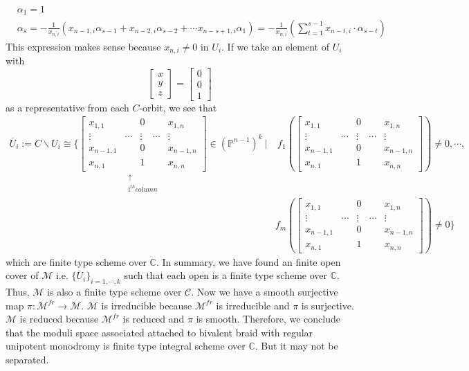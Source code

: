 \begin{example}
	\begin{align*}
		&\alpha_1=1\\
		&\alpha_s=-\frac{1}{x_{n,i}}(x_{n-1,i}\alpha_{s-1}+x_{n-2,i}\alpha_{s-2}+\cdots x_{n-s+1,i}\alpha_{1})
		=-\frac{1}{x_{n,i}}(\sum_{t=1}^{s-1} x_{n-t,i}\cdot\alpha_{s-t} )
	\end{align*}
This expression makes sense because $x_{n,i}\neq 0$ in $U_i$.
If we take an element of $U_i$ with 
\[
	\begin{bmatrix}
		x\\
		y\\
		z
	\end{bmatrix}
	=
	\begin{bmatrix}
		0\\
		0\\
		1
	\end{bmatrix}	
\]
as a representative from each $C$-orbit, we see that 
\begin{align*}
	\overline{U}_i
	:= C\backslash U_i\cong
	\{
	\underset{\substack{\uparrow \\ \text{i}^{th} column}}
	{\begin{bmatrix}
		x_{1,1}&&0 &&x_{1,n}\\
		\vdots&\cdots&\vdots&\cdots&\vdots\\
		x_{n-1,1}&&0&&x_{n-1,n}\\
		x_{n,1}&&1&&x_{n,n}
	\end{bmatrix}}
	\in (\mathbb{P}^{n-1})^k~|
	&~	
	f_1(\begin{bmatrix}
		x_{1,1}&&0 &&x_{1,n}\\
		\vdots&\cdots&\vdots&\cdots&\vdots\\
		x_{n-1,1}&&0&&x_{n-1,n}\\
		x_{n,1}&&1&&x_{n,n}
	\end{bmatrix})\neq0,
	\cdots,\\
	& 
	f_m(\begin{bmatrix}
		x_{1,1}&&0 &&x_{1,n}\\
		\vdots&\cdots&\vdots&\cdots&\vdots\\
		x_{n-1,1}&&0&&x_{n-1,n}\\
		x_{n,1}&&1&&x_{n,n}
	\end{bmatrix})\neq 0\}	
\end{align*}
which are finite type scheme over $\mathbb{C}$. In summary, we have found an finite open cover of $\mathcal{M}$ i.e. $\{\overline{U}_i\}_{i=1,\cdots,k}$ such that each open is a finite type scheme over $\mathbb{C}$. Thus, $\mathcal{M}$ is also a finite type scheme over $\mathcal{C}$. Now we have a smooth surjective map $\pi : \mathcal{M}^{fr}\rightarrow \mathcal{M}$. $\mathcal{M}$ is irreducible because $\mathcal{M}^{fr}$ is irreducible and $\pi$ is surjective. $\mathcal{M}$ is reduced because $\mathcal{M}^{fr}$ is reduced and $\pi$ is smooth. Therefore, we conclude that the moduli space associated attached to bivalent braid with regular unipotent monodromy is finite type integral scheme over $\mathbb{C}$. But it may not be separated.\\

\end{example}
